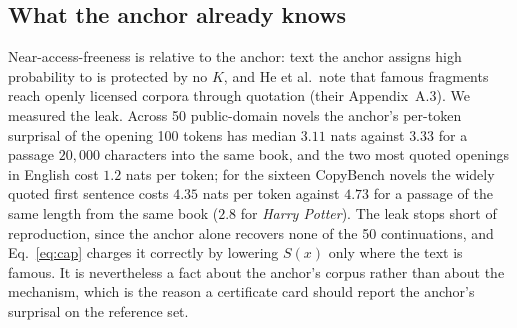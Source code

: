 \subsection{What the anchor already knows}\label{sec:leakage}
Near-access-freeness is relative to the anchor: text the anchor assigns high probability to is protected by no $K$, and He et al.\ note that famous fragments reach openly licensed corpora through quotation (their Appendix~A.3). We measured the leak. Across 50 public-domain novels the anchor's per-token surprisal of the opening 100 tokens has median $3.11$ nats against $3.33$ for a passage $20{,}000$ characters into the same book, and the two most quoted openings in English cost $1.2$ nats per token; for the sixteen CopyBench novels the widely quoted first sentence costs $4.35$ nats per token against $4.73$ for a passage of the same length from the same book ($2.8$ for \emph{Harry Potter}). The leak stops short of reproduction, since the anchor alone recovers none of the 50 continuations, and Eq.~\eqref{eq:cap} charges it correctly by lowering $S(x)$ only where the text is famous. It is nevertheless a fact about the anchor's corpus rather than about the mechanism, which is the reason a certificate card should report the anchor's surprisal on the reference set.
